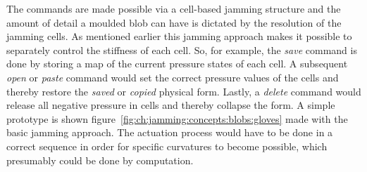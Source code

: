 The commands are made possible via a cell-based jamming structure and the amount of detail a moulded blob can have is dictated by the resolution of the jamming cells.
As mentioned earlier this jamming approach makes it possible to separately control the stiffness of each cell.
So, for example, the \emph{save} command is done by storing a map of the current pressure states of each cell.
A subsequent \emph{open} or \emph{paste} command would set the correct pressure values of the cells and thereby restore the \emph{saved} or \emph{copied} physical form.
Lastly, a \emph{delete} command would release all negative pressure in cells and thereby collapse the form.
A simple prototype is shown figure~\ref{fig:ch:jamming:concepts:blobs:gloves} made with the basic jamming approach.
The actuation process would have to be done in a correct sequence in order for specific curvatures to become possible, which presumably could be done by computation.

